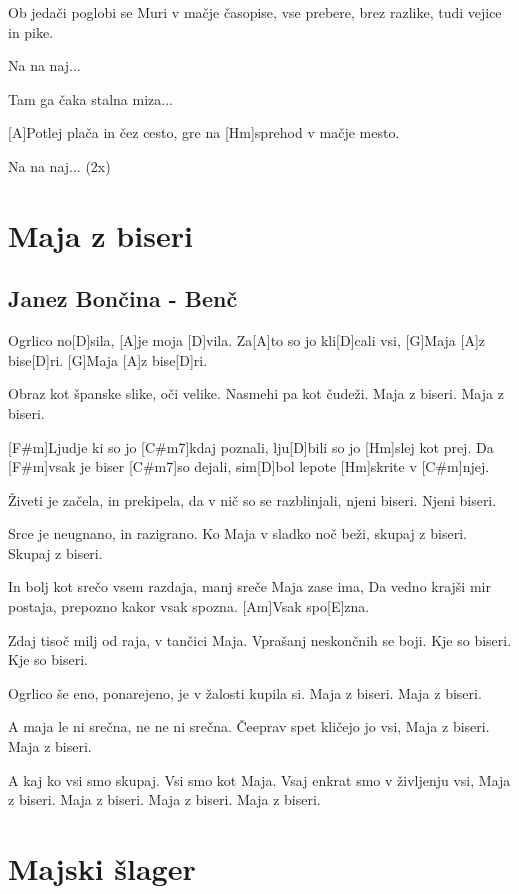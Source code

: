 \documentclass[a4paper,12pt]{article}
\begin{document}
\begin{multicols}{2}
\begin{guitar}
Ob jedači poglobi se Muri v mačje časopise,
vse prebere, brez razlike, tudi vejice in pike.


Na na naj...


Tam ga čaka stalna miza...


[A]Potlej plača in čez cesto, gre na
[Hm]sprehod v mačje mesto.


Na na naj... (2x)

\end{guitar}
\section{Maja z biseri}
\subsection*{Janez Bončina - Benč}
\begin{guitar}
[A]Ogrlico no[D]sila,
[A]je moja [D]vila.
Za[A]to so jo kli[D]cali vsi,
[G]Maja [A]z bise[D]ri.
[G]Maja [A]z bise[D]ri.


Obraz kot španske slike,
oči velike.
Nasmehi pa kot čudeži.
Maja z biseri.
Maja z biseri.


[F#m]Ljudje ki so jo [C#m7]kdaj poznali,
lju[D]bili so jo [Hm]slej kot prej.
Da [F#m]vsak je biser [C#m7]so dejali,
sim[D]bol lepote [Hm]skrite v [C#m]njej.


Živeti je začela,
in prekipela,
da v nič so se razblinjali,
njeni biseri.
Njeni biseri.


Srce je neugnano,
in razigrano.
Ko Maja v sladko noč beži,
skupaj z biseri.
Skupaj z biseri.


In bolj kot srečo vsem razdaja,
manj sreče Maja zase ima,
Da vedno krajši mir postaja,
prepozno kakor vsak spozna.
[Am]Vsak spo[E]zna.


Zdaj tisoč milj od raja,
v tančici Maja.
Vprašanj neskončnih se boji.
Kje so biseri.
Kje so biseri.


Ogrlico še eno,
ponarejeno,
je v žalosti kupila si.
Maja z biseri.
Maja z biseri.


A maja le ni srečna,
ne ne ni srečna.
Čeeprav spet kličejo jo vsi,
Maja z biseri.
Maja z biseri.


A kaj ko vsi smo skupaj.
Vsi smo kot Maja.
Vsaj enkrat smo v življenju vsi,
Maja z biseri.
Maja z biseri.
Maja z biseri.
Maja z biseri.

\end{guitar}
\section{Majski šlager}

\end{multicols}
\end{document}
